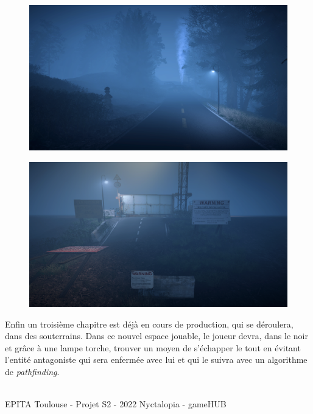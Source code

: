 \begin{figure}[H]
\centering
\begin{minipage}{.5\textwidth}
  \centering
  \includegraphics[width=.7\linewidth]{img/uwufolder/spawn.png}
  \label{fig:égouts1}
\end{minipage}%
\begin{minipage}{.5\textwidth}
  \centering
  \includegraphics[width=.7\linewidth]{img/uwufolder/military.png}
  \label{fig:égouts2}
\end{minipage}
\end{figure}





Enfin un troisième chapitre est déjà en cours de production, qui se déroulera, dans des souterrains. Dans ce nouvel espace jouable, le joueur devra, dans le noir et grâce à une lampe torche, trouver un moyen de s'échapper le tout en évitant l'entité antagoniste qui sera enfermée avec lui et qui le suivra avec un algorithme de \emph{pathfinding}.

\vfill
\noindent\makebox[\linewidth]{\rule{.8\paperwidth}{.6pt}}\\[0.2cm]
EPITA Toulouse - Projet S2 - 2022 \hfill Nyctalopia - gameHUB
\noindent\makebox[\linewidth]{\rule{.8\paperwidth}{.6pt}}
\newpage

